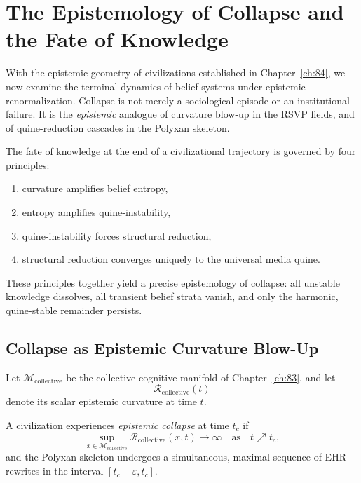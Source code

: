 \chapter{The Epistemology of Collapse and the Fate of Knowledge}
\label{ch:85}

With the epistemic geometry of civilizations established in 
Chapter~\ref{ch:84}, we now examine the terminal dynamics of belief
systems under epistemic renormalization.  
Collapse is not merely a sociological episode or an institutional failure.  
It is the \emph{epistemic} analogue of curvature blow-up in the RSVP
fields, and of quine-reduction cascades in the Polyxan skeleton.

The fate of knowledge at the end of a civilizational trajectory is
governed by four principles:

\begin{enumerate}
\item curvature amplifies belief entropy,
\item entropy amplifies quine-instability,
\item quine-instability forces structural reduction,
\item structural reduction converges uniquely to the universal media quine.
\end{enumerate}

These principles together yield a precise epistemology of collapse:
all unstable knowledge dissolves, all transient belief strata vanish,
and only the harmonic, quine-stable remainder persists.

\section{Collapse as Epistemic Curvature Blow-Up}

Let $\mathcal{M}_{\mathrm{collective}}$ be the collective cognitive
manifold of Chapter~\ref{ch:83}, and let
\[
\mathcal{R}_{\mathrm{collective}}(t)
\]
denote its scalar epistemic curvature at time $t$.

\begin{definition}
A civilization experiences \emph{epistemic collapse} at time $t_c$ if
\[
\sup_{x \in \mathcal{M}_{\mathrm{collective}}}
\mathcal{R}_{\mathrm{collective}}(x,t)
\to \infty
\quad\text{as}\quad
t \nearrow t_c,
\]
and the Polyxan skeleton undergoes a simultaneous, maximal sequence of
EHR rewrites in the interval $[t_c-\varepsilon,t_c]$.
\end{definition}

